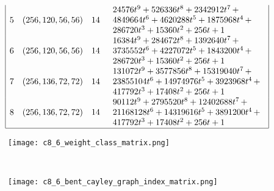 \documentclass[12pt,a4paper]{article}
\begin{document}
\begin{table}[!bhpt]
\begin{align*}
\begin{array}{|cccl|}
5 &
(256, 120, 56, 56) &
14 &
\begin{array}{l}
24576t^{9} + 526336t^{8} + 2342912t^{7}
\,+
\\
 4849664t^{6} + 4620288t^{5} + 1875968t^{4}
\,+
\\
 286720t^{3} + 15360t^{2} + 256t + 1
\end{array}
\\
6 &
(256, 120, 56, 56) &
14 &
\begin{array}{l}
16384t^{9} + 284672t^{8} + 1392640t^{7}
\,+
\\
 3735552t^{6} + 4227072t^{5} + 1843200t^{4}
\,+
\\
 286720t^{3} + 15360t^{2} + 256t + 1
\end{array}
\\
7 &
(256, 136, 72, 72) &
14 &
\begin{array}{l}
131072t^{9} + 3577856t^{8} + 15319040t^{7}
\,+
\\
 23855104t^{6} + 14974976t^{5} + 3923968t^{4}
\,+
\\
 417792t^{3} + 17408t^{2} + 256t + 1
\end{array}
\\
8 &
(256, 136, 72, 72) &
14 &
\begin{array}{l}
90112t^{9} + 2795520t^{8} + 12402688t^{7}
\,+
\\
 21168128t^{6} + 14319616t^{5} + 3891200t^{4}
\,+
\\
 417792t^{3} + 17408t^{2} + 256t + 1
\end{array}
\\
\hline
\end{array}
\end{align*}
%
\caption{$[f_{8,6}]$ extended Cayley classes.}
\label{tab-c8_6_EC_classes}
\end{table}

\begin{figure}[!bhpt] %
\centering
\begin{minipage}{.48\textwidth}
  \centering
  \texttt{[image: c8\_6\_weight\_class\_matrix.png]}
  \label{fig:c8_6_weight_class_matrix}
\end{minipage}%
~~~~
\begin{minipage}{.48\textwidth}
  \centering
  \texttt{[image: c8\_6\_bent\_cayley\_graph\_index\_matrix.png]}
  \label{fig:c8_6_bent_cayley_graph_index_matrix}
\end{minipage}
\end{figure}
\end{document}

